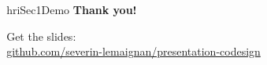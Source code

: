 \documentclass[xcolor=table]{beamer}
\begin{document}

{
    \begin{frame}[plain]

        \begin{columns}
            \begin{column}{0.6\linewidth}
            \end{column}
            \begin{column}{0.4\linewidth}

                \vspace{6em}
                \begin{beamercolorbox}[wd=\linewidth,ht=6ex,dp=0.7ex]{hriSec1Demo}
                    \textbf{Thank you!}

                    \vspace{2em}
                    \footnotesize
                    Get the slides:\\
                    \href{https://github.com/severin-lemaignan/presentation-codesign}{github.com/severin-lemaignan/presentation-codesign}
                \end{beamercolorbox}
            \end{column}
        \end{columns}
    \end{frame}
}

\appendix
{}
\end{document}

